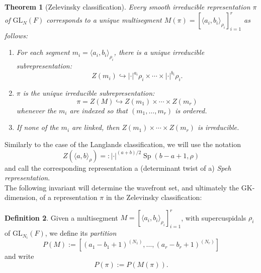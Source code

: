 \documentclass{amsart}
\newcommand{\into}{\hookrightarrow}
\newcommand{\GL}{\mathrm{GL}}
\newcommand{\1}{\m 1}
\DeclareMathOperator{\Speh}{\mathrm{Sp}}
\newtheorem{thm}{Theorem}[subsection]
\newtheorem{prop}[thm]{Proposition}
\theoremstyle{remark}
\theoremstyle{definition}
\newtheorem{dfn}[thm]{Definition}
\numberwithin{equation}{subsection}
\newcommand{\red}[1]{\textcolor{red}{#1}}
\begin{document}
\begin{thm}[Zelevinsky classification]
Every smooth irreducible representation $\pi$ of $\GL_N(F)$ corresponds to a unique multisegment $M(\pi) = [\langle a_i,b_i \rangle_{\rho_i}]_{i=1}^r$ as follows:
\begin{enumerate}
    \item For each segment $m_i = \langle a_i,b_i \rangle_{\rho_i}$, there is a unique irreducible subrepresentation:
    \[
    Z(m_i) \into |\cdot|^{a_i} \rho_i \times \cdots \times |\cdot|^{b_i} \rho_i.
    \]
    \item $\pi$ is the unique irreducible subrepresentation:
    \[
    \pi = Z(M) \into Z(m_1) \times \cdots \times Z(m_r)
    \] 
    whenever the $m_i$ are indexed so that $(m_1, \dotsc, m_r)$ is ordered. 
    \item If none of the $m_i$ are linked, then $Z(m_1) \times \cdots \times Z(m_r)$ is irreducible.
\end{enumerate}
\end{thm}

Similarly to the case of the Langlands classification, we will use the notation 
\begin{equation} \label{eq: Speh def}
Z(\langle a, b \rangle_{\rho}) =: |\cdot|^{(a+b)/2} \Speh(b-a + 1, \rho) 
\end{equation}
and call the corresponding representation a (determinant twist of a) \emph{Speh representation}.\\

The following invariant will determine the wavefront set, and ultimately the GK-dimension, of a representation $\pi$ in the Zelevinsky classification:

\begin{dfn} \label{def: partition}
 Given a multisegment $M = [\langle a_i,b_i \rangle_{\rho_i}]_{i=1}^r$, with supercuspidals $\rho_i$ of $\GL_{N_i}(F)$, we define its \emph{partition}
\[
P(M) := [(a_1-b_1+1)^{(N_1)}, \dots, (a_r-b_r+1)^{(N_r)}]
\]
and write
\[
P(\pi) := P(M(\pi)). 
\] 
\end{dfn}


\end{document}
